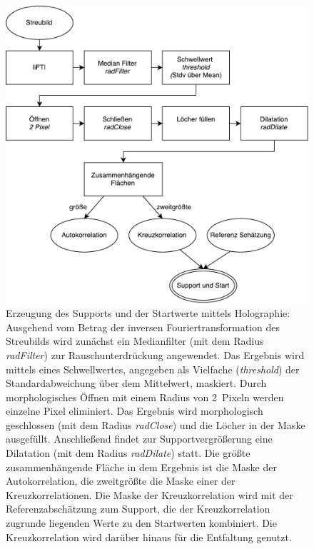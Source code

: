 \begin{figure}
	\centering
	\includegraphics[width=.65\textwidth]{images/flow_holosupport.pdf}
	\caption[Support mittels Holographie]{Erzeugung des Supports und der Startwerte mittels Holographie: Ausgehend vom Betrag der inversen Fouriertransformation des Streubilds wird zunächst ein Medianfilter (mit dem Radius \textit{radFilter}) zur Rauschunterdrückung angewendet. Das Ergebnis wird mittels eines Schwellwertes, angegeben als Vielfache (\textit{threshold}) der Standardabweichung über dem Mittelwert, maskiert. Durch morphologisches Öffnen mit einem Radius von \SI{2}{Pixeln} werden einzelne Pixel eliminiert. Das Ergebnis wird morphologisch geschlossen (mit dem Radius \textit{radClose}) und die Löcher in der Maske ausgefüllt. Anschließend findet zur Supportvergrößerung eine Dilatation (mit dem Radius \textit{radDilate}) statt. Die größte zusammenhängende Fläche in dem Ergebnis ist die Maske der Autokorrelation, die zweitgrößte die Maske einer der Kreuzkorrelationen. Die Maske der Kreuzkorrelation wird mit der Referenzabschätzung zum Support, die der Kreuzkorrelation zugrunde liegenden Werte zu den Startwerten kombiniert. Die Kreuzkorrelation wird darüber hinaus für die Entfaltung genutzt.}
	\label{fig:flow_holosupport}
\end{figure} 

